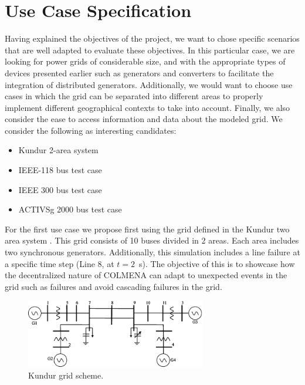 \documentclass{article}
\begin{document}
\section{Use Case Specification}\label{sec:kundur}

Having explained the objectives of the project, we want to chose specific scenarios that are well adapted to evaluate these objectives. In this particular case, we are looking for power grids of considerable size, and with the appropriate types of devices presented earlier such as generators and converters to facilitate the integration of distributed generators. Additionally, we would want to choose use cases in which the grid can be separated into different areas to properly implement different geographical contexts to take into account. Finally, we also consider the ease to access information and data about the modeled grid. We consider the following as interesting candidates: 

\begin{itemize}
    \item Kundur 2-area system \cite{grids:kundur}
    \item IEEE-118 bus test case \cite{grids:ieee118} 
    \item IEEE 300 bus test case  \cite{grids:ieee300} 
    \item ACTIVSg 2000 bus test case  \cite{grids:activsg2000} 
\end{itemize}


For the first use case we propose first using the grid defined in the Kundur two area system  \cite{grids:kundur}. This grid consists of 10 buses divided in 2 areas. Each area includes two synchronous generators. Additionally, this simulation includes a line failure at a specific time step (Line 8, at $t=2$~s). The objective of this is to showcase how the decentralized nature of COLMENA can adapt to unexpected events in the grid such as failures and avoid cascading failures in the grid. 

\begin{figure}[!htb]
    \centering
    \includegraphics[width=0.7\textwidth]{pictures/kundurgrid.png}
    \caption{Kundur grid scheme. \cite{grids:kundur}}
    \label{fig:kundur2}
\end{figure}
\end{document}
